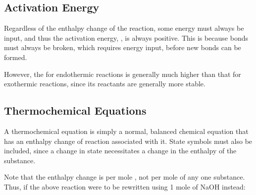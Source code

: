 

		\pagebreak
		\subsection{Activation Energy}

			Regardless of the enthalpy change of the reaction, some energy must always be input, and thus the activation energy, \ea, is
			always positive. This is because bonds must always be broken, which requires energy input, before new bonds can be formed.

			However, the \ea for endothermic reactions is generally much higher than that for exothermic reactions, since its reactants
			are generally more stable.


		\subsection{Thermochemical Equations}

			A thermochemical equation is simply a normal, balanced chemical equation that has an enthalpy change of reaction associated with
			it. State symbols must also be included, since a change in state necessitates a change in the enthalpy of the substance.


			Note that the enthalpy change is per mole , not per mole of any one substance. Thus, if the above reaction
			were to be rewritten using 1 mole of NaOH instead:

